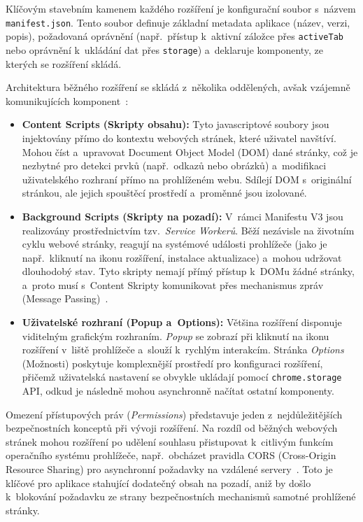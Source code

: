 \documentclass[a4paper,12pt]{article}
\begin{document}
Klíčovým stavebním kamenem každého rozšíření je konfigurační soubor s~názvem \texttt{manifest.json}. Tento soubor definuje základní metadata aplikace (název, verzi, popis), požadovaná oprávnění (např.~přístup k~aktivní záložce přes \texttt{activeTab} nebo oprávnění k~ukládání dat přes \texttt{storage}) a~deklaruje komponenty, ze kterých se rozšíření skládá.

Architektura běžného rozšíření se skládá z~několika oddělených, avšak vzájemně komunikujících komponent~\autocite{frisbie2025}:
\begin{itemize}
    \item \textbf{Content Scripts (Skripty obsahu):} Tyto javascriptové soubory jsou injektovány přímo do kontextu webových stránek, které uživatel navštíví. Mohou číst a~upravovat Document Object Model (DOM) dané stránky, což je nezbytné pro detekci prvků (např.~odkazů nebo obrázků) a~modifikaci uživatelského rozhraní přímo na prohlíženém webu. Sdílejí DOM s~originální stránkou, ale jejich spouštěcí prostředí a~proměnné jsou izolované.
    \item \textbf{Background Scripts (Skripty na pozadí):} V~rámci Manifestu V3 jsou realizovány prostřednictvím tzv.~\textit{Service Workerů}. Běží nezávisle na životním cyklu webové stránky, reagují na systémové události prohlížeče (jako je např.~kliknutí na ikonu rozšíření, instalace aktualizace) a~mohou udržovat dlouhodobý stav. Tyto skripty nemají přímý přístup k~DOMu žádné stránky, a~proto musí s~Content Skripty komunikovat přes mechanismus zpráv (Message Passing)~\autocite{chrome_api}.
    \item \textbf{Uživatelské rozhraní (Popup a~Options):} Většina rozšíření disponuje viditelným grafickým rozhraním. \textit{Popup} se zobrazí při kliknutí na ikonu rozšíření v~liště prohlížeče a~slouží k~rychlým interakcím. Stránka \textit{Options} (Možnosti) poskytuje komplexnější prostředí pro konfiguraci rozšíření, přičemž uživatelská nastavení se obvykle ukládají pomocí \texttt{chrome.storage} API, odkud je následně mohou asynchronně načítat ostatní komponenty.
\end{itemize}

Omezení přístupových práv (\textit{Permissions}) představuje jeden z~nejdůležitějších bezpečnostních konceptů při vývoji rozšíření. Na rozdíl od běžných webových stránek mohou rozšíření po udělení souhlasu přistupovat k~citlivým funkcím operačního systému prohlížeče, např.~obcházet pravidla CORS (Cross-Origin Resource Sharing) pro asynchronní požadavky na vzdálené servery~\autocite{mdn_extensions}. Toto je klíčové pro aplikace stahující dodatečný obsah na pozadí, aniž by došlo k~blokování požadavku ze strany bezpečnostních mechanismů samotné prohlížené stránky.
\end{document}
